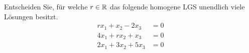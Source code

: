 \begin{ExerciseBlock}
Entscheiden Sie, für welche $r \in \mathbb{R}$ das folgende homogene LGS unendlich viele Lösungen besitzt.
\begin{equation*}
\begin{split}
	r x_1 + x_2 - 2 x_3 &= 0 \\
 		4 x_1 + r x_2 + x_3 &= 0 \\
 		2 x_1 + 3 x_2 + 5 x_3 &= 0
\end{split}
\end{equation*}

\end{ExerciseBlock}
